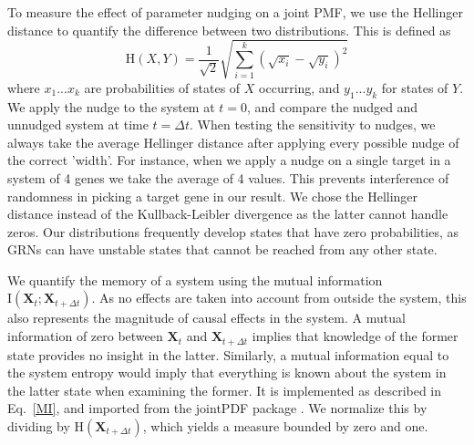 \documentclass[../main.tex]{subfiles}
\begin{document}
To measure the effect of parameter nudging on a joint PMF, we use the Hellinger distance to quantify the difference between two distributions.
This is defined as
%
\begin{equation}
\mathrm{H}\left( X, Y\right) = \frac{1}{\sqrt{2}} \sqrt{\sum^k_{i=1} (\sqrt{x_i} - \sqrt{y_i})^2}
\end{equation}
%
where ${x_1 ... x_k}$ are probabilities of states of $X$ occurring, and ${y_1 ... y_k}$ for states of $Y$.
We apply the nudge to the system at $t = 0$, and compare the nudged and unnudged system at time $t = \Delta t$.
When testing the sensitivity to nudges, we always take the average Hellinger distance after applying every possible nudge of the correct 'width'.
For instance, when we apply a nudge on a single target in a system of 4 genes we take the average of 4 values.
This prevents interference of randomness in picking a target gene in our result.
We chose the Hellinger distance instead of the Kullback-Leibler divergence as the latter cannot handle zeros.
Our distributions frequently develop states that have zero probabilities, as GRNs can have unstable states that cannot be reached from any other state.

We quantify the memory of a system using the mutual information $\mathrm{I}\left(\mathbf{X}_t ; \mathbf{X}_{t + \Delta t}\right)$.
As no effects are taken into account from outside the system, this also represents the magnitude of causal effects in the system.
A mutual information of zero between $\mathbf{X}_t$ and $\mathbf{X}_{t + \Delta t}$ implies that knowledge of the former state provides no insight in the latter.
Similarly, a mutual information equal to the system entropy would imply that everything is known about the system in the latter state when examining the former.
It is implemented as described in Eq.~\ref{MI}, and imported from the jointPDF package \cite{jointpdf}.
We normalize this by dividing by $\mathrm{H}\left(\mathbf{X}_{t + \Delta t}\right)$, which yields a measure bounded by zero and one.
\end{document}
